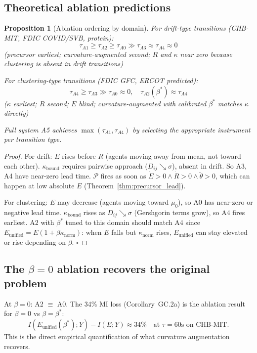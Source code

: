 \documentclass[11pt,a4paper]{article}
\newtheorem{proposition}[theorem]{Proposition}
\theoremstyle{definition}
\begin{document}
\subsection{Theoretical ablation predictions}

\begin{proposition}[Ablation ordering by domain]
\label{prop:ablation_ordering}
For drift-type transitions (CHB-MIT, FDIC COVID/SVB, protein):
\[
\tau_{A1} \geq \tau_{A2} \geq \tau_{A0} \gg \tau_{A3} \approx \tau_{A4} \approx 0
\]
(precursor earliest; curvature-augmented second; $R$ and $\kappa$ near zero because
 clustering is absent in drift transitions)

For clustering-type transitions (FDIC GFC, ERCOT predicted):
\[
\tau_{A4} \geq \tau_{A3} \gg \tau_{A0} \approx 0, \quad \tau_{A2}(\beta^*) \approx \tau_{A4}
\]
($\kappa$ earliest; $R$ second; $E$ blind; curvature-augmented with
 calibrated $\beta^*$ matches $\kappa$ directly)

Full system A5 achieves $\max(\tau_{A1},\tau_{A4})$ by selecting the
appropriate instrument per transition type.
\end{proposition}

\begin{proof}
For drift: $E$ rises before $R$ (agents moving away from mean, not toward each other).
$\kappa_\mathrm{bound}$ requires pairwise approach ($D_{ij}\searrow\sigma$), absent in drift.
So A3, A4 have near-zero lead time.
$\mathcal{P}$ fires as soon as $\dot E > 0 \wedge \dot R > 0 \wedge \ddot\theta > 0$,
which can happen at low absolute $E$ (Theorem~\ref{thm:precursor_lead}).

For clustering: $E$ may decrease (agents moving toward $\mu_0$),
so A0 has near-zero or negative lead time.
$\kappa_\mathrm{bound}$ rises as $D_{ij}\searrow\sigma$ (Gershgorin terms grow),
so A4 fires earliest.
A2 with $\beta^*$ tuned to this domain should match A4 since
$E_\mathrm{unified} = E(1+\beta\kappa_\mathrm{norm})$: when $E$ falls but
$\kappa_\mathrm{norm}$ rises, $E_\mathrm{unified}$ can stay elevated or rise
depending on $\beta$. $\square$
\end{proof}

\subsection{The $\beta = 0$ ablation recovers the original problem}

At $\beta = 0$: A2 $\equiv$ A0.
The 34\% MI loss (Corollary~GC.2a) is the ablation result for
$\beta = 0$ vs $\beta = \beta^*$:
\[
I(E_\mathrm{unified}(\beta^*); Y) - I(E; Y) \approx 34\%
\quad\text{at }\tau=60\text{s on CHB-MIT.}
\]
This is the direct empirical quantification of what curvature augmentation recovers.
\end{document}
